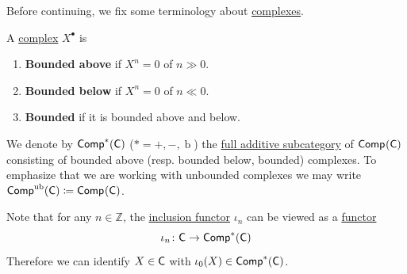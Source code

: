 \documentclass[../../main]{subfiles}
\begin{document}
Before continuing, we fix some terminology about \hyperref[def:complex]{complexes}.
\begin{definition}\label{def:bounded-complex}
  A \hyperref[def:complex]{complex} \(X^{\bullet}\) is
  \begin{enumerate}
    \item \textbf{Bounded above} if \(X^{n} = 0\) of \(n \gg 0\).
    \item \textbf{Bounded below} if \(X^{n} = 0\) of \(n \ll 0\).
    \item \textbf{Bounded} if it is bounded above and below.
  \end{enumerate}
  We denote by \(\Complex[\ast]{\category{C}}\) (\(\ast = +, -, \operatorname{b}\)) the \hyperref[def:full-additive-subcategory]{full additive subcategory} of \(\Complex{\category{C}}\) consisting of bounded above (resp. bounded below, bounded) complexes.
  To emphasize that we are working with unbounded complexes we may write \(\Complex[\operatorname{ub}]{\category{C}} \coloneq \Complex{\category{C}}\).
\end{definition}

\begin{remark}\label{rem:identification-complex}
  Note that for any \(n \in \mathbb{Z}\), the \hyperref[rem:identification-diff]{inclusion functor} \(\iota_{n}\) can be viewed as a \hyperref[def:functor]{functor}
  \begin{equation*}
    \iota_{n}\colon \category{C} \to \Complex[\ast]{\category{C}}
  \end{equation*}
  Therefore we can identify \(X \in \category{C}\) with \(\iota_{0}(X) \in \Complex[\ast]{\category{C}}\).
\end{remark}

\end{document}
